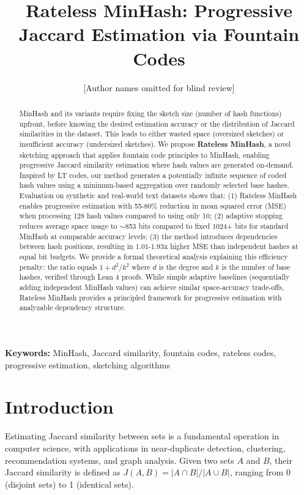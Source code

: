 \documentclass[11pt,letterpaper]{article}
\title{Rateless MinHash: Progressive Jaccard Estimation via Fountain Codes}
\author{[Author names omitted for blind review]}
\date{}
\begin{document}
\maketitle

\begin{abstract}
MinHash and its variants require fixing the sketch size (number of hash functions) upfront, before knowing the desired estimation accuracy or the distribution of Jaccard similarities in the dataset. This leads to either wasted space (oversized sketches) or insufficient accuracy (undersized sketches). We propose \textbf{Rateless MinHash}, a novel sketching approach that applies fountain code principles to MinHash, enabling progressive Jaccard similarity estimation where hash values are generated on-demand. Inspired by LT codes, our method generates a potentially infinite sequence of coded hash values using a minimum-based aggregation over randomly selected base hashes. Evaluation on synthetic and real-world text datasets shows that: (1) Rateless MinHash enables progressive estimation with 55-80\% reduction in mean squared error (MSE) when processing 128 hash values compared to using only 10; (2) adaptive stopping reduces average space usage to $\sim$853 bits compared to fixed 1024+ bits for standard MinHash at comparable accuracy levels; (3) the method introduces dependencies between hash positions, resulting in 1.01-1.93x higher MSE than independent hashes at equal bit budgets. We provide a formal theoretical analysis explaining this efficiency penalty: the ratio equals $1 + d^2/k^2$ where $d$ is the degree and $k$ is the number of base hashes, verified through Lean 4 proofs. While simple adaptive baselines (sequentially adding independent MinHash values) can achieve similar space-accuracy trade-offs, Rateless MinHash provides a principled framework for progressive estimation with analyzable dependency structure.
\end{abstract}

\noindent\textbf{Keywords:} MinHash, Jaccard similarity, fountain codes, rateless codes, progressive estimation, sketching algorithms

\section{Introduction}

Estimating Jaccard similarity between sets is a fundamental operation in computer science, with applications in near-duplicate detection, clustering, recommendation systems, and graph analysis. Given two sets $A$ and $B$, their Jaccard similarity is defined as $J(A,B) = |A \cap B| / |A \cup B|$, ranging from 0 (disjoint sets) to 1 (identical sets).
\end{document}
